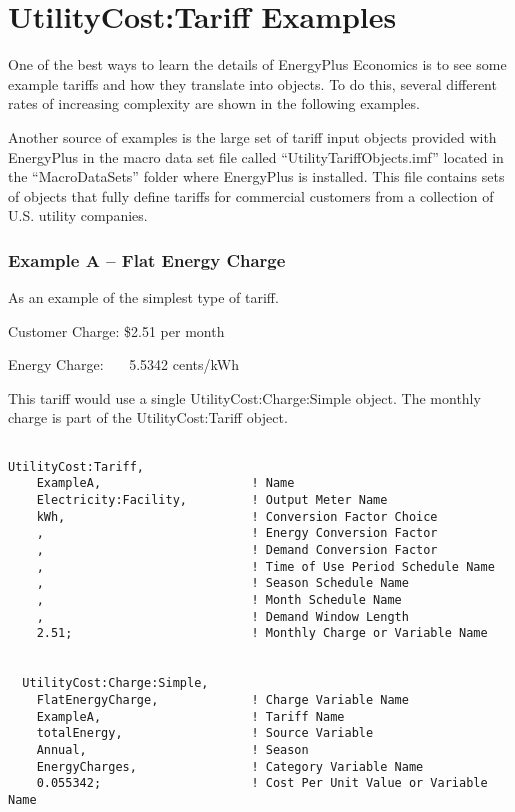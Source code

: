 \section{UtilityCost:Tariff Examples}\label{utilitycosttariff-examples}

One of the best ways to learn the details of EnergyPlus Economics is to see some example tariffs and how they translate into objects. To do this, several different rates of increasing complexity are shown in the following examples.

Another source of examples is the large set of tariff input objects provided with EnergyPlus in the macro data set file called ``UtilityTariffObjects.imf'' located in the ``MacroDataSets'' folder where EnergyPlus is installed. This file contains sets of objects that fully define tariffs for commercial customers from a collection of U.S. utility companies.

\subsubsection{Example A -- Flat Energy Charge}\label{example-a-flat-energy-charge}

As an example of the simplest type of tariff.

Customer Charge: \$2.51 per month

Energy Charge:~~~ 5.5342 cents/kWh

This tariff would use a single UtilityCost:Charge:Simple object. The monthly charge is part of the UtilityCost:Tariff object.

\begin{lstlisting}

UtilityCost:Tariff,
    ExampleA,                     ! Name
    Electricity:Facility,         ! Output Meter Name
    kWh,                          ! Conversion Factor Choice
    ,                             ! Energy Conversion Factor
    ,                             ! Demand Conversion Factor
    ,                             ! Time of Use Period Schedule Name
    ,                             ! Season Schedule Name
    ,                             ! Month Schedule Name
    ,                             ! Demand Window Length
    2.51;                         ! Monthly Charge or Variable Name


  UtilityCost:Charge:Simple,
    FlatEnergyCharge,             ! Charge Variable Name
    ExampleA,                     ! Tariff Name
    totalEnergy,                  ! Source Variable
    Annual,                       ! Season
    EnergyCharges,                ! Category Variable Name
    0.055342;                     ! Cost Per Unit Value or Variable Name
\end{lstlisting}

